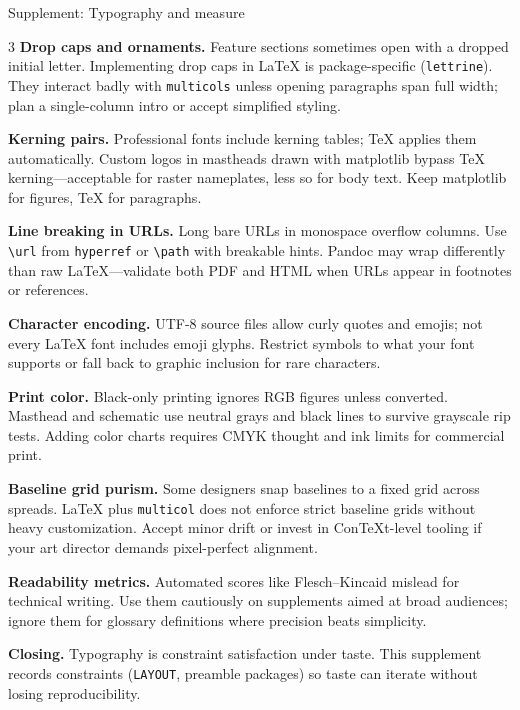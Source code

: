 \documentclass[
  ignorenonframetext,
]{beamer}
\begin{document}
\begin{frame}[fragile]{Supplement: Typography and measure}
\begin{multicols}{3}
\textbf{Drop caps and ornaments.} Feature sections sometimes open with a
dropped initial letter. Implementing drop caps in LaTeX is
package-specific (\texttt{lettrine}). They interact badly with
\texttt{multicols} unless opening paragraphs span full width; plan a
single-column intro or accept simplified styling.

\textbf{Kerning pairs.} Professional fonts include kerning tables; TeX
applies them automatically. Custom logos in mastheads drawn with
matplotlib bypass TeX kerning---acceptable for raster nameplates, less
so for body text. Keep matplotlib for figures, TeX for paragraphs.

\textbf{Line breaking in URLs.} Long bare URLs in monospace overflow
columns. Use \texttt{\textbackslash{}url} from \texttt{hyperref} or
\texttt{\textbackslash{}path} with breakable hints. Pandoc may wrap
differently than raw LaTeX---validate both PDF and HTML when URLs appear
in footnotes or references.

\textbf{Character encoding.} UTF-8 source files allow curly quotes and
emojis; not every LaTeX font includes emoji glyphs. Restrict symbols to
what your font supports or fall back to graphic inclusion for rare
characters.

\textbf{Print color.} Black-only printing ignores RGB figures unless
converted. Masthead and schematic use neutral grays and black lines to
survive grayscale rip tests. Adding color charts requires CMYK thought
and ink limits for commercial print.

\textbf{Baseline grid purism.} Some designers snap baselines to a fixed
grid across spreads. LaTeX plus \texttt{multicol} does not enforce
strict baseline grids without heavy customization. Accept minor drift or
invest in ConTeXt-level tooling if your art director demands
pixel-perfect alignment.

\textbf{Readability metrics.} Automated scores like Flesch--Kincaid
mislead for technical writing. Use them cautiously on supplements aimed
at broad audiences; ignore them for glossary definitions where precision
beats simplicity.

\textbf{Closing.} Typography is constraint satisfaction under taste.
This supplement records constraints (\texttt{LAYOUT}, preamble packages)
so taste can iterate without losing reproducibility.

\end{multicols}
\end{frame}
\end{document}
